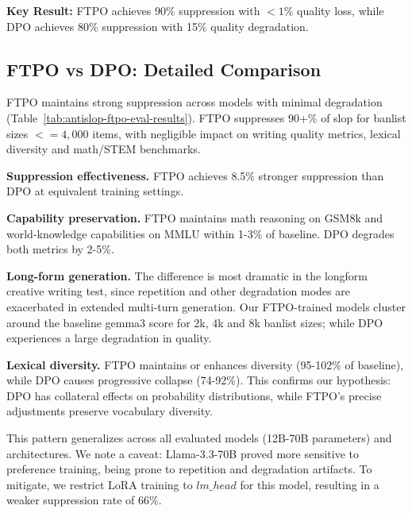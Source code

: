 \documentclass[11pt]{article}
\begin{document}
\begin{tcolorbox}[colback=gray!5,colframe=black,left=1mm,right=1mm,top=1mm,bottom=1mm]
\textbf{Key Result:} FTPO achieves 90\% suppression with $<1\%$ quality loss, while DPO achieves 80\% suppression with 15\% quality degradation.
\end{tcolorbox}






\subsection{FTPO vs DPO: Detailed Comparison}
FTPO maintains strong suppression across models with minimal degradation (Table~\ref{tab:antislop-ftpo-eval-results}). FTPO suppresses 90+\% of slop for banlist sizes $<= 4,000$ items, with negligible impact on writing quality metrics, lexical diversity and math/STEM benchmarks.




\textbf{Suppression effectiveness.} FTPO achieves 8.5\% stronger suppression than DPO at equivalent training settings. 

\textbf{Capability preservation.} FTPO maintains math reasoning on GSM8k and world-knowledge capabilities on MMLU within 1-3\% of baseline. DPO degrades both metrics by 2-5\%.

\textbf{Long-form generation.} The difference is most dramatic in the longform creative writing test, since repetition and other degradation modes are exacerbated in extended multi-turn generation. Our FTPO-trained models cluster around the baseline gemma3 score for 2k, 4k and 8k banlist sizes; while DPO experiences a large degradation in quality.

\textbf{Lexical diversity.} FTPO maintains or enhances diversity (95-102\% of baseline), while DPO causes progressive collapse (74-92\%). This confirms our hypothesis: DPO has collateral effects on probability distributions, while FTPO's precise adjustments preserve vocabulary diversity.

This pattern generalizes across all evaluated models (12B-70B parameters) and architectures. We note a caveat: Llama-3.3-70B proved more sensitive to preference training, being prone to repetition and degradation artifacts. To mitigate, we restrict LoRA training to $lm\_head$ for this model, resulting in a weaker suppression rate of 66\%.


\setlength\LTleft{0pt}
\setlength\LTright{0pt}
\end{document}
